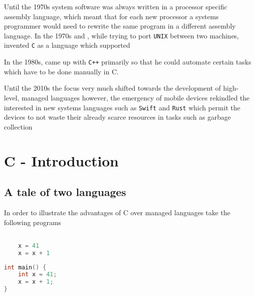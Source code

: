 \par{Until the 1970s system software was always written in a processor specific assembly
language, which meant that for each new processor a systems programmer would need to rewrite the
same program in a different assembly language. In the 1970s  and  , while trying to port \texttt{UNIX} between two machines, invented \texttt{C} as a
 language which supported }

\par{In the 1980s,  came up with \texttt{C++} primarily so that he could
automate certain tasks which have to be done manually in C.}

\par{Until the 2010s the focus very much shifted towards the development of high-level, managed
languages however, the emergency of mobile devices rekindled the interested in new systems languages such as \texttt{Swift} and \texttt{Rust} which permit the devices to not waste their already scarce resources in tasks such as garbage collection}

\section{C - Introduction}


\subsection{A tale of two languages}

\par{In order to illustrate the advantages of C over managed languages take the following programs}

\noindent\begin{minipage}[t]{.45\textwidth}
	\begin{lstlisting}[language=python,]

	x = 41
	x = x + 1
	\end{lstlisting}
	\end{minipage}
\noindent\begin{minipage}[t]{.45\textwidth}
	\begin{lstlisting}[language=C,]
int main() {
	int x = 41;
	x = x + 1;
}
	\end{lstlisting}
\end{minipage}


